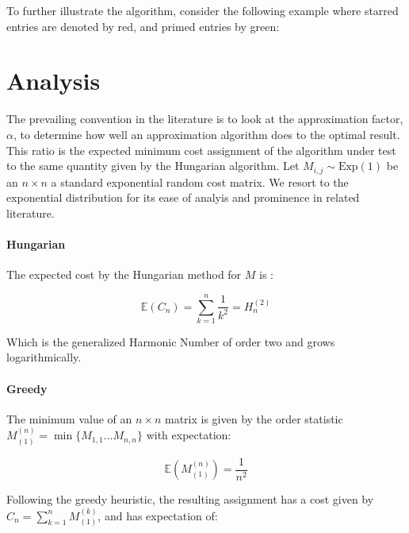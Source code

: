 \documentclass{article}
\newcommand{\set}[1]{\lbrace #1 \rbrace}
\newcommand{\expected}[1]{\mathbb{E} \left ( #1 \right )}
\newcommand{\exprv}[1]{\text{Exp} \left( #1 \right )}
\begin{document}
To further illustrate the algorithm, consider the following example where starred entries are denoted by red, and primed entries by green:


\section{Analysis}

The prevailing convention in the literature is to look at the approximation factor, $\alpha$, to determine how well an approximation algorithm does to the optimal result. This ratio is the expected minimum cost assignment of the algorithm under test to the same quantity given by the Hungarian algorithm. Let $M_{i,j} \sim \exprv{1}$ be an $n \times n$ a standard exponential random cost matrix. We resort to the exponential distribution for its ease of analyis and prominence in related literature.

\paragraph{Hungarian}

The expected cost by the Hungarian method for $M$ is \cite{aldous2001zeta}:

\begin{equation}
	\expected{C_n} = \sum_{k = 1}^{n} \frac{1}{k^2} = H_{n}^{(2)}
\end{equation}

Which is the generalized Harmonic Number of order two and grows logarithmically.

\paragraph{Greedy}

The minimum value of an $n \times n$ matrix is given by the order statistic $M^{(n)}_{(1)} = \min \set{ M_{1,1} \ldots M_{n, n} }$ with expectation:

\begin{equation}
	\expected{ M^{(n)}_{(1)} } = \frac{1}{n^2}
\end{equation}

Following the greedy heuristic, the resulting assignment has a cost given by $C_n = \sum_{k=1}^{n} M^{(k)}_{(1)}$, and has expectation of:
\end{document}
